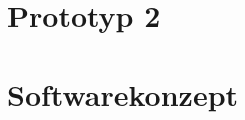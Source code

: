 


\section{Prototyp 2}









\section{Softwarekonzept}


\label{Softwarekonzeptzeichnung1.pdf}


\label{Softwarekonzeptzeichnung2.pdf}


\label{Softwarekonzeptzeichnung3.pdf}


\label{Softwarekonzeptzeichnung4.pdf}